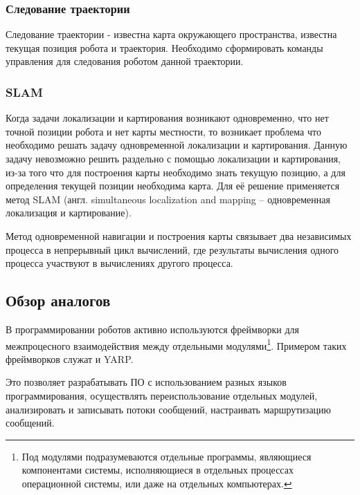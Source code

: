 \subsubsection{Следование траектории}
Следование траектории - известна карта окружающего пространства, известна
текущая позиция робота и траектория. Необходимо сформировать команды управления
для следования роботом данной траектории.

\subsubsection{SLAM}
Когда задачи локализации и картирования возникают одновременно, что нет точной
позиции робота и нет карты местности, то возникает проблема что необходимо
решать задачу одновременной локализации и картирования. Данную задачу
невозможно решить раздельно с помощью локализации и картирования, из-за того
что для построения карты необходимо знать текущую позицию, а для определения
текущей позиции необходима карта. Для её решение применяется метод SLAM (англ.
simultaneous localization and mapping -- одновременная локализация и
картирование).

Метод одновременной навигации и построения карты связывает два независимых
процесса в непрерывный цикл вычислений, где результаты вычисления одного
процесса участвуют в вычислениях другого процесса.

\subsection{Обзор аналогов}

В программировании роботов активно используются фреймворки для межпроцесного
взаимодействия между отдельными модулями\footnote{Под модулями подразумеваются
отдельные программы, являющиеся компонентами системы, исполняющиеся в отдельных
процессах операционной системы, или даже на отдельных компьютерах.}. Примером
таких фреймворков служат \ros{} и YARP.

Это позволяет разрабатывать ПО с использованием разных языков программирования,
осуществлять переиспользование отдельных модулей, анализировать и записывать
потоки сообщений, настраивать маршрутизацию сообщений.

